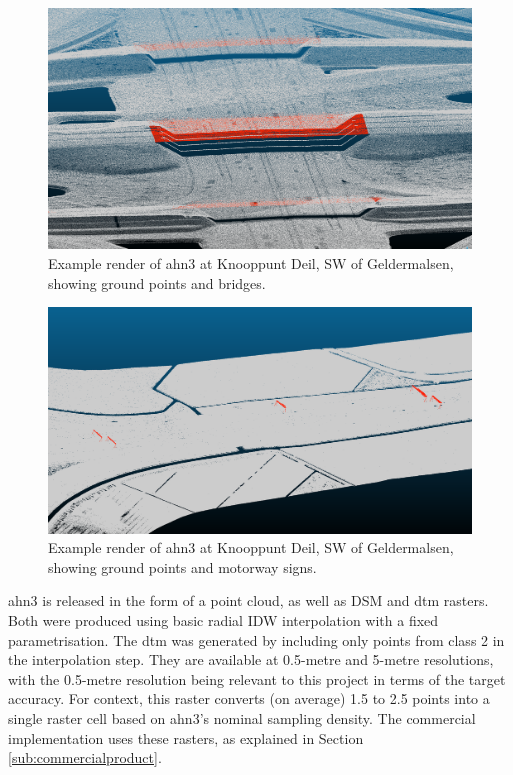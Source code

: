 \begin{figure}
    \centering
    \includegraphics[width=\linewidth]{final_report/figs/ahn_sample_01.png} 
    \caption{Example render of \ac{ahn3} at Knooppunt Deil, SW of Geldermalsen, showing ground points and bridges.}
    \label{fig:ahnbridges}
\end{figure}

\begin{figure}
    \centering
    \includegraphics[width=\linewidth]{final_report/figs/ahn_sample_02.png} 
    \caption{Example render of \ac{ahn3} at Knooppunt Deil, SW of Geldermalsen, showing ground points and motorway signs.}
    \label{fig:ahnsigns}
\end{figure}

\ac{ahn3} is released in the form of a point cloud, as well as DSM and \ac{dtm} rasters. Both were produced using basic radial IDW interpolation with a fixed parametrisation. The \ac{dtm} was generated by including only points from class 2 in the interpolation step. They are available at 0.5-metre and 5-metre resolutions, with the 0.5-metre resolution being relevant to this project in terms of the target accuracy. For context, this raster converts (on average) 1.5 to 2.5 points into a single raster cell based on \ac{ahn3}'s nominal sampling density. The commercial implementation uses these rasters, as explained in Section \ref{sub:commercialproduct}.

